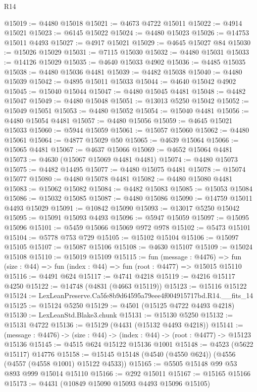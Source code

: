 \begin{lexlean}{R14}
\begin{coremodule}
@15019 := @4480 @15018
@15021 := @4673 @4722 @15011
@15022 := @4914 @15021
@15023 := @6145 @15022
@15024 := @4480 @15023
@15026 := @14753 @15011 @4493
@15027 := @4917 @15021
@15029 := @4645 @15027 @84
@15030 := @15026 @15029
@15031 := @7115 @15030
@15032 := @4480 @15031
@15033 := @14126 @15029
@15035 := @4640 @15033 @4902
@15036 := @4485 @15035
@15038 := @4480 @15036 @4481
@15039 := @4482 @15038
@15040 := @4480 @15039
@15042 := @4895 @15011 @15033
@15044 := @4640 @15042 @4902
@15045 := @15040 @15044
@15047 := @4480 @15045 @4481
@15048 := @4482 @15047
@15049 := @4480 @15048
@15051 := @13013 @5250 @15042
@15052 := @15049 @15051
@15053 := @4480 @15052
@15054 := @15040 @4481
@15056 := @4480 @15054 @4481
@15057 := @4480 @15056
@15059 := @4645 @15021 @15033
@15060 := @5944 @15059
@15061 := @15057 @15060
@15062 := @4480 @15061
@15064 := @4877 @15029 @50
@15065 := @4639 @15064
@15066 := @15065 @4481
@15067 := @4637 @15066
@15069 := @4652 @15064 @4481
@15073 := @4630 (@15067 @15069 @4481 @4481)
@15074 := @4480 @15073
@15075 := @4482 @14495
@15077 := @4480 @15075 @4481
@15078 := @15074 @15077
@15080 := @4480 @15078 @4481
@15082 := @4480 @15080 @4481
@15083 := @15062 @15082
@15084 := @4482 @15083
@15085 := @15053 @15084
@15086 := @15032 @15085
@15087 := @4480 @15086
@15090 := @14759 @15011 @4493 @15029
@15091 := @10842 @15090
@15093 := @13017 @5250 @15042
@15095 := @15091 @15093 @4493
@15096 := @5947 @15059
@15097 := @15095 @15096
@15101 := @5459 @15066 @15069 @972 @978
@15102 := @5473 @15101
@15104 := @5778 @753 @729
@15105 := @15102 @15104
@15106 := @15097 @15105
@15107 := @15087 @15106
@15108 := @4630 @15107
@15109 := @15024 @15108
@15110 := @15019 @15109
@15115 := fun (message : @4476) =>
  fun (size : @44) => fun (index : @44) => fun (root : @4477) => @15015 @15110
@15116 := @4491 @624
@15117 := @4741 @4218
@15119 := @4216 @15117 @4250
@15122 := @14748 (@4831 (@4663 @15119))
@15123 := @15116 @15122
@15124 := LexLeanPreserve.Ca5fe8b9d64595a79eee4f004915717bd.R14.__fits_14
@15125 := @15124 @5250
@15129 := @4501 (@15125 @4722 @4493 @4218)
@15130 := LexLeanStd.Blake3.chunk
@15131 := @15130 @5250
@15132 := @15131 @4722
@15136 := @15129 (@4431 (@15132 @4493 @4218))
@15141 := (message : @4476) -> (size : @44) -> (index : @44) -> (root : @4477) -> @15123 @15136
@15145 := @4515 @624 @15122 @15136 @1001
@15148 := @4523 (@5622 @15117) @14776
@15158 := @15145 @15148 (@4540 (@4550 @624)) (@4556 (@4557 (@4558 @1001) @15122 @4533))
@15165 := @5505 @15148 @99 @53 @893 @999 @15014 @15110
@15166 := @292 @15011
@15167 := @15165 @15166
@15173 := @4431 (@10849 @15090 @15093 @4493 @15096 @15105)

\end{coremodule}
\end{lexlean}
